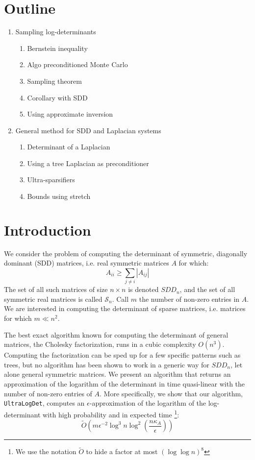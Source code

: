 
\section*{Outline}
\begin{enumerate}
\item Sampling log-determinants

\begin{enumerate}
\item Bernstein inequality 
\item Algo preconditioned Monte Carlo 
\item Sampling theorem 
\item Corollary with SDD 
\item Using approximate inversion
\end{enumerate}
\item General method for SDD and Laplacian systems

\begin{enumerate}
\item Determinant of a Laplacian 
\item Using a tree Laplacian as preconditioner
\item Ultra-sparsifiers
\item Bounds using stretch
\end{enumerate}
\end{enumerate}

\section{Introduction}

We consider the problem of computing the determinant of symmetric,
diagonally dominant (SDD) matrices, i.e. real symmetric matrices $A$
for which: 
\[
A_{ii}\geq\sum_{j\neq i}\left|A_{ij}\right|
\]
The set of all such matrices of size $n\times n$ is denoted $SDD_{n}$,
and the set of all symmetric real matrices is called $\mathcal{S}_{n}$.
Call $m$ the number of non-zero entries in $A$. We are interested
in computing the determinant of sparse matrices, i.e. matrices for
which $m\ll n^{2}$.

The best exact algorithm known for computing the determinant of general
matrices, the Cholesky factorization, runs in a cubic complexity $O\left(n^{3}\right)$.
Computing the factorization can be sped up for a few specific patterns
such as trees, but no algorithm has been shown to work in a generic
way for $SDD_{n}$, let alone general symmetric matrices. We present
an algorithm that returns an approximation of the logarithm of the
determinant in time quasi-linear with the number of non-zero entries
of $A$. More specifically, we show that our algorithm, \texttt{UltraLogDet},
computes an $\epsilon$-approximation of the logarithm of the log-determinant
with high probability and in expected time%
\footnote{We use the notation $\tilde{O}$ to hide a factor at most $\left(\log\log n\right)^{8}$%
}: 
\[
\tilde{O}\left(m\epsilon^{-2}\log^{3}n\log^{2}\left(\frac{n\kappa_A}{\epsilon}\right)\right)
\]%


